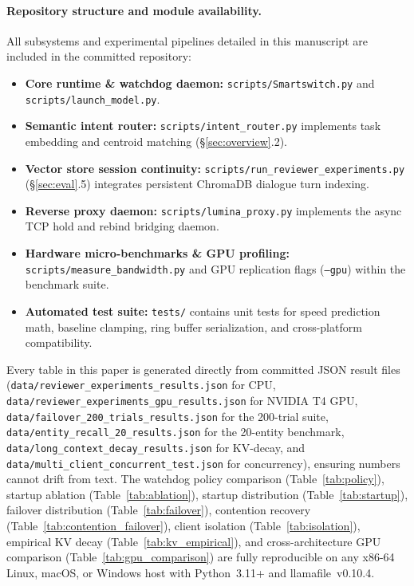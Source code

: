 \documentclass[11pt,a4paper]{article}
\newcommand{\code}[1]{\texttt{#1}}
\begin{document}
\paragraph{Repository structure and module availability.}
All subsystems and experimental pipelines detailed in this manuscript are included in the committed repository:
\begin{itemize}[leftmargin=*]
  \item \textbf{Core runtime \& watchdog daemon:} \code{scripts/Smartswitch.py} and \code{scripts/launch\_model.py}.
  \item \textbf{Semantic intent router:} \code{scripts/intent\_router.py} implements task embedding and centroid matching (\S\ref{sec:overview}.2).
  \item \textbf{Vector store session continuity:} \code{scripts/run\_reviewer\_experiments.py} (\S\ref{sec:eval}.5) integrates persistent ChromaDB dialogue turn indexing.
  \item \textbf{Reverse proxy daemon:} \code{scripts/lumina\_proxy.py} implements the async TCP hold and rebind bridging daemon.
  \item \textbf{Hardware micro-benchmarks \& GPU profiling:} \code{scripts/measure\_bandwidth.py} and GPU replication flags (\code{--gpu}) within the benchmark suite.
  \item \textbf{Automated test suite:} \code{tests/} contains unit tests for speed prediction math, baseline clamping, ring buffer serialization, and cross-platform compatibility.
\end{itemize}

Every table in this paper is generated directly from committed JSON result files (\code{data/reviewer\_experiments\_results.json} for CPU, \code{data/reviewer\_experiments\_gpu\_results.json} for NVIDIA T4 GPU, \code{data/failover\_200\_trials\_results.json} for the 200-trial suite, \code{data/entity\_recall\_20\_results.json} for the 20-entity benchmark, \code{data/long\_context\_decay\_results.json} for KV-decay, and \code{data/multi\_client\_concurrent\_test.json} for concurrency), ensuring numbers cannot drift from text. The watchdog policy comparison (Table~\ref{tab:policy}), startup ablation (Table~\ref{tab:ablation}), startup distribution (Table~\ref{tab:startup}), failover distribution (Table~\ref{tab:failover}), contention recovery (Table~\ref{tab:contention_failover}), client isolation (Table~\ref{tab:isolation}), empirical KV decay (Table~\ref{tab:kv_empirical}), and cross-architecture GPU comparison (Table~\ref{tab:gpu_comparison}) are fully reproducible on any x86-64 Linux, macOS, or Windows host with Python~3.11+ and llamafile~v0.10.4.
\end{document}
